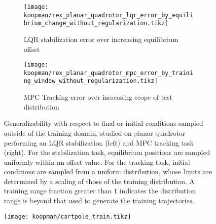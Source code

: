 \documentclass[../root.tex]{subfiles}
\begin{document}
\begin{figure}
  \begin{subfigure}{0.49\textwidth}
    \centering
    \texttt{[image: koopman/rex\_planar\_quadrotor\_lqr\_error\_by\_equilibrium\_change\_without\_regularization.tikz]}
    \caption{LQR stabilization error over increasing equilibrium offset 
    }
    \label{fig:rex_planar_quadrotor_lqr_error_by_equilibrium_change}
  \end{subfigure}
  \hfill
  \begin{subfigure}{0.48\textwidth}
    \raggedright
    \texttt{[image: koopman/rex\_planar\_quadrotor\_mpc\_error\_by\_training\_window\_without\_regularization.tikz]}
    \caption{MPC Tracking error over increasing scope of test distribution 
    }
    \label{fig:rex_planar_quadrotor_mpc_error_by_training_window}
  \end{subfigure}
  \caption{Generalizability with respect to final or initial conditions sampled outside of the training domain, studied on planar quadrotor performing an LQR stabilization (left) and MPC tracking task (right). For the stabilization task,  equilibrium positions are sampled uniformly within an offset value. For the tracking task,  initial conditions are sampled from a uniform distribution, whose limits are determined by a scaling of those of the training distribution. A training range fraction greater than $1$
   indicates the distribution range is beyond that used to generate 
  the training trajectories.
  }
  \label{fig:training_window}
\end{figure}

\begin{figure}
    \centering
    \texttt{[image: koopman/cartpole\_train.tikz]}
    \caption{}
    \label{fig:cartpole_train}
    \hfill
\end{figure}
\end{document}
